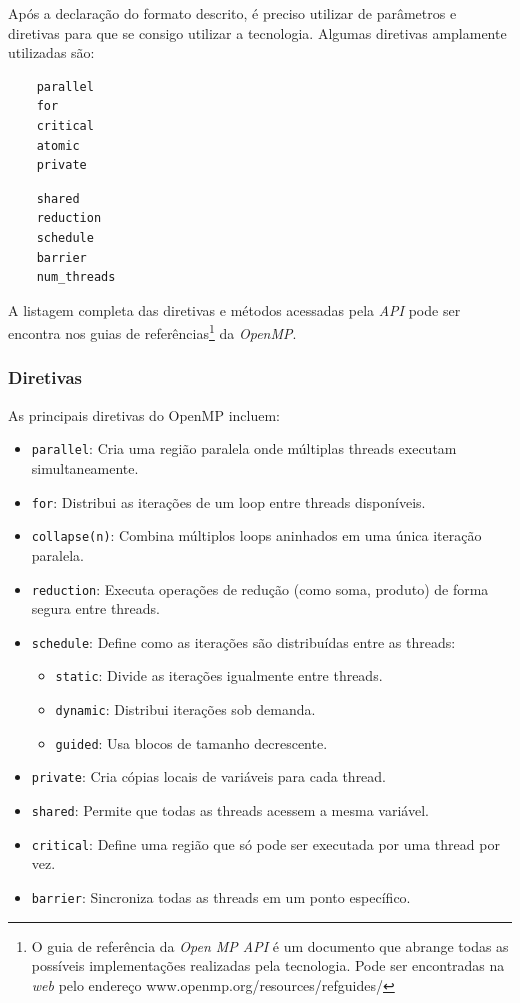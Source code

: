 \documentclass[12pt]{article}
\begin{document}
Após a declaração do formato descrito, é preciso utilizar de parâmetros e diretivas para que se consigo utilizar a tecnologia. Algumas diretivas amplamente utilizadas são:

\begin{minipage}[t]{0.48\textwidth}
  \begin{verbatim}
    parallel
    for
    critical
    atomic
    private
  \end{verbatim}
  \end{minipage}
\hfill
\begin{minipage}[t]{0.48\textwidth}
  \begin{verbatim}
    shared
    reduction
    schedule
    barrier
    num_threads
  \end{verbatim}
  \end{minipage}

A listagem completa das diretivas e métodos acessadas pela \emph{API} pode ser encontra nos guias de referências\footnote{O guia de referência da \emph{Open MP API} é um documento que abrange todas as possíveis implementações realizadas pela tecnologia. Pode ser encontradas na \emph{web} pelo endereço www.openmp.org/resources/refguides/} da \emph{OpenMP}.

\subsubsection{Diretivas}
As principais diretivas do OpenMP incluem:

\begin{itemize}
    \item \texttt{parallel}: Cria uma região paralela onde múltiplas threads executam simultaneamente.
    \item \texttt{for}: Distribui as iterações de um loop entre threads disponíveis.
    \item \texttt{collapse(n)}: Combina múltiplos loops aninhados em uma única iteração paralela.
    \item \texttt{reduction}: Executa operações de redução (como soma, produto) de forma segura entre threads.
    \item \texttt{schedule}: Define como as iterações são distribuídas entre as threads:
        \begin{itemize}
            \item \texttt{static}: Divide as iterações igualmente entre threads.
            \item \texttt{dynamic}: Distribui iterações sob demanda.
            \item \texttt{guided}: Usa blocos de tamanho decrescente.
        \end{itemize}
    \item \texttt{private}: Cria cópias locais de variáveis para cada thread.
    \item \texttt{shared}: Permite que todas as threads acessem a mesma variável.
    \item \texttt{critical}: Define uma região que só pode ser executada por uma thread por vez.
    \item \texttt{barrier}: Sincroniza todas as threads em um ponto específico.
\end{itemize}
\end{document}
